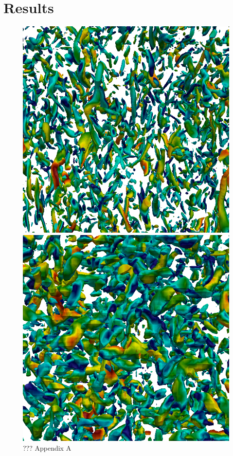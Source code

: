 \documentclass[11pt,a4paper,openany,oneside,parskip=half*]{article}
\begin{document}
\section{Results}
\begin{figure}[h]
    \centering
    \begin{minipage}[t]{.5\textwidth}
        \centering
        \includegraphics[width=0.95\linewidth]{./Abbildungen/256_velocity_4.png}
        \caption{???}
        \label{256_velocity}
    \end{minipage}%
    \begin{minipage}[t]{0.5\textwidth}
        \centering
        \includegraphics[width=0.95\linewidth]{./Abbildungen/64_velocity.png}
        \caption{??? Appendix A}
        \label{64_velocity}
    \end{minipage}
\end{figure}
\end{document}
